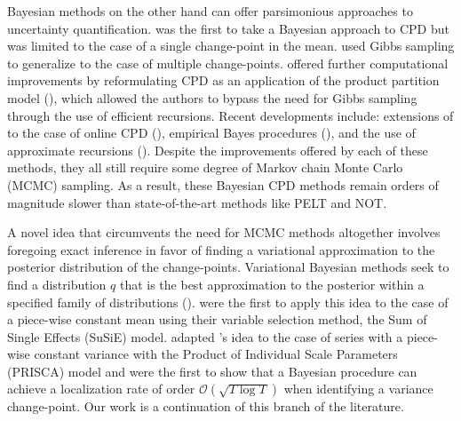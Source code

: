 Bayesian methods on the other hand can offer parsimonious approaches to uncertainty quantification. \cite{Smith75} was the first to take a Bayesian approach to CPD but was limited to the case of a single change-point in the mean. \cite{Stephens94} used Gibbs sampling to generalize to the case of multiple change-points. \cite{Barry93} offered further computational improvements by reformulating CPD as an application of the product partition model (\citealp{Hartigan90, Barry92}), which allowed the authors to bypass the need for Gibbs sampling through the use of efficient recursions. Recent developments include: extensions of \cite{Barry93} to the case of online CPD (\citealp{Fearnhead06, Adams07}), empirical Bayes procedures (\citealp{Liu17}), and the use of approximate recursions (\citealp{Cappello21}). Despite the improvements offered by each of these methods, they all still require some degree of Markov chain Monte Carlo (MCMC) sampling. As a result, these Bayesian CPD methods remain orders of magnitude slower than state-of-the-art methods like PELT and NOT.

A novel idea that circumvents the need for MCMC methods altogether involves foregoing exact inference in favor of finding a variational approximation to the posterior distribution of the change-points. Variational Bayesian methods seek to find a distribution $q$ that is the best approximation to the posterior within a specified family of distributions (\citealp{Jordan99, Bishop06, Wainwright08, Blei17}). \cite{Wang20} were the first to apply this idea to the case of a piece-wise constant mean using their variable selection method, the Sum of Single Effects (SuSiE) model. \cite{Cappello22} adapted \citeauthor{Wang20}'s idea to the case of series with a piece-wise constant variance with the Product of Individual Scale Parameters (PRISCA) model and were the first to show that a Bayesian procedure can achieve a localization rate of order $\mathcal{O}(\sqrt{T\log T})$ when identifying a variance change-point. Our work is a continuation of this branch of the literature.

